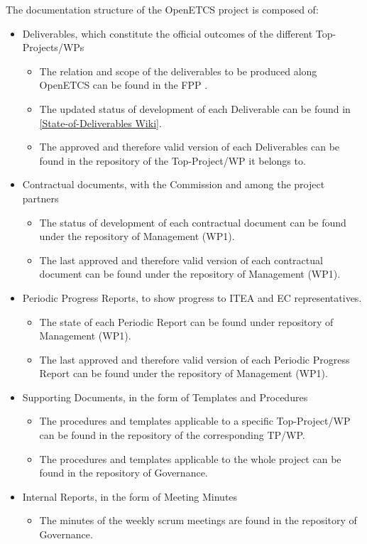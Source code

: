 \documentclass{template/openetcs_article}
\begin{document}
The documentation structure of the OpenETCS project is composed of:
\begin{itemize}
\item Deliverables, which constitute the official outcomes of the different Top-Projects/\gls{WP}s
\begin{itemize}
\item The relation and scope of the deliverables to be produced along OpenETCS can be found in the FPP \citep{fpp}.
\item The updated status of development of each Deliverable can be found in 
\href{https://github.com/openETCS/management/wiki/State-of-Deliverables}{[State-of-Deliverables Wiki]}.
\item The approved and therefore valid version of each Deliverables can be found in the repository of the Top-Project/\gls{WP} it belongs to. 
\end{itemize}
\item Contractual documents, with the Commission and among the project partners
\begin{itemize}
\item The status of development of each contractual document can be found under the repository of Management (WP1).
\item The last approved and therefore valid version of each contractual document can be found under the repository of Management (WP1).
\end{itemize}
\item Periodic Progress Reports, to show progress to ITEA and EC representatives.
\begin{itemize}
\item The state of each Periodic Report can be found under repository of Management (WP1).
\item The last approved and therefore valid version of each Periodic Progress Report can be found under the repository of Management (WP1). 
\end{itemize}
\item Supporting Documents, in the form of Templates and Procedures
\begin{itemize}
\item The procedures and templates applicable to a specific Top-Project/\gls{WP} can be found in the repository of the corresponding TP/\gls{WP}.
\item The procedures and templates applicable to the whole project can be found in the repository of Governance.
\end{itemize}
\item Internal Reports, in the form of Meeting Minutes
\begin{itemize}
\item The minutes of the weekly scrum meetings are found in the repository of Governance.
\end{itemize}
\end{itemize}
\end{document}
